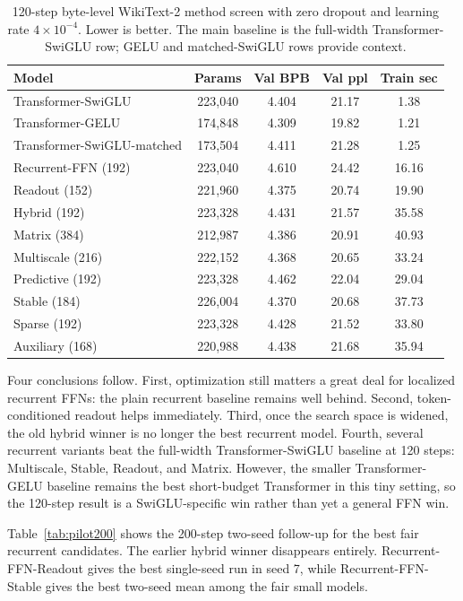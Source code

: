 \documentclass[11pt]{article}
\begin{document}
\begin{table}[t]
  \centering
  \small
  \caption{120-step byte-level WikiText-2 method screen with zero dropout and
  learning rate $4 \times 10^{-4}$. Lower is better. The main baseline is the
  full-width Transformer-SwiGLU row; GELU and matched-SwiGLU rows provide
  context.}
  \label{tab:pilot120}
  \begin{tabular}{lcccc}
    \toprule
    Model & Params & Val BPB & Val ppl & Train sec \\
    \midrule
    Transformer-SwiGLU & 223,040 & 4.404 & 21.17 & 1.38 \\
    Transformer-GELU & 174,848 & 4.309 & 19.82 & 1.21 \\
    Transformer-SwiGLU-matched & 173,504 & 4.411 & 21.28 & 1.25 \\
    Recurrent-FFN (192) & 223,040 & 4.610 & 24.42 & 16.16 \\
    Readout (152) & 221,960 & 4.375 & 20.74 & 19.90 \\
    Hybrid (192) & 223,328 & 4.431 & 21.57 & 35.58 \\
    Matrix (384) & 212,987 & 4.386 & 20.91 & 40.93 \\
    Multiscale (216) & 222,152 & 4.368 & 20.65 & 33.24 \\
    Predictive (192) & 223,328 & 4.462 & 22.04 & 29.04 \\
    Stable (184) & 226,004 & 4.370 & 20.68 & 37.73 \\
    Sparse (192) & 223,328 & 4.428 & 21.52 & 33.80 \\
    Auxiliary (168) & 220,988 & 4.438 & 21.68 & 35.94 \\
    \bottomrule
  \end{tabular}
\end{table}

Four conclusions follow. First, optimization still matters a great deal for
localized recurrent FFNs: the plain recurrent baseline remains well behind.
Second, token-conditioned readout helps immediately. Third, once the search
space is widened, the old hybrid winner is no longer the best recurrent model.
Fourth, several recurrent variants beat the full-width Transformer-SwiGLU
baseline at 120 steps: Multiscale, Stable, Readout, and Matrix. However, the
smaller Transformer-GELU baseline remains the best short-budget Transformer in
this tiny setting, so the 120-step result is a SwiGLU-specific win rather than
yet a general FFN win.

Table~\ref{tab:pilot200} shows the 200-step two-seed follow-up for the best
fair recurrent candidates. The earlier hybrid winner disappears entirely.
Recurrent-FFN-Readout gives the best single-seed run in seed 7, while
Recurrent-FFN-Stable gives the best two-seed mean among the fair small models.
\end{document}

